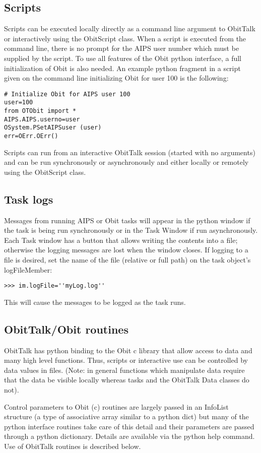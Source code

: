 \documentclass[11pt]{report}
\begin{document}
\subsection{Scripts}
Scripts can be executed locally directly as a command line argument to
ObitTalk or interactively using the ObitScript class.
When a script is executed from the command line, there is no prompt for
the AIPS user number which must be supplied by the script.
To use all features of the Obit python interface, a full
initialization of Obit is also needed.
An example python fragment in a script given on the command line
initializing Obit for user 100 is the following:
\begin{verbatim}
# Initialize Obit for AIPS user 100
user=100
from OTObit import *
AIPS.AIPS.userno=user
OSystem.PSetAIPSuser (user) 
err=OErr.OErr()
\end{verbatim}

Scripts can run from an interactive ObitTalk session (started with no
arguments) and can be run synchronously or asynchronously and either
locally or remotely using the ObitScript class.


\subsection{Task logs}
Messages from running AIPS or Obit tasks will appear in the python
window if the task is being run synchronously or in the Task Window
if run asynchronously.
Each Task window has a button that allows writing the contents into a
file; otherwise the logging messages are lost when the window closes.
If logging to a file is desired, set the name of the file (relative or
full path) on the task object's logFileMember:
\begin{verbatim}
>>> im.logFile=''myLog.log''
\end{verbatim}
This will cause the messages to be logged as the task runs.

\subsection{ObitTalk/Obit routines}
ObitTalk has python binding to the Obit c library that allow access to
data and many high level functions.
Thus, scripts or interactive use can be controlled by data values in
files.
(Note: in general functions which manipulate data require that the
data be visible locally whereas tasks and the ObitTalk Data classes do
not). 

Control parameters to Obit (c) routines are largely passed in an
InfoList structure (a type of associative array similar to a python
dict) but many of the python interface routines take care of this
detail and their parameters are passed through a python dictionary.
Details are available via the python help command.
Use of ObitTalk routines is described below.
\end{document}
